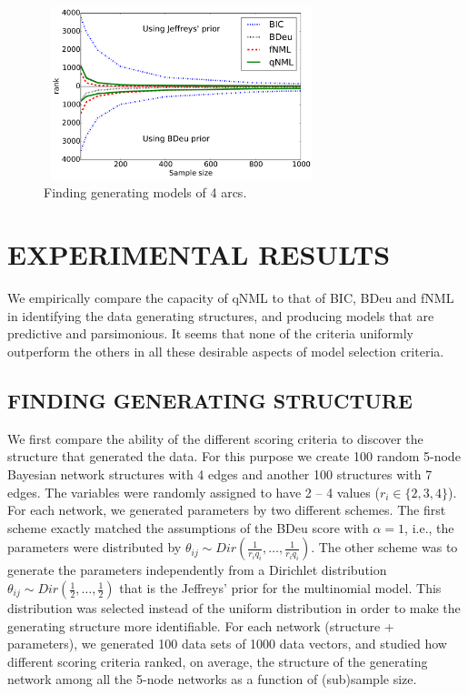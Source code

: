 \begin{figure}[h]
\centering
\includegraphics[width=8cm,height=5cm]{qNML_images/art4_mean.pdf}
\caption{Finding generating models of 4 arcs.}
\label{fig:4arcs}
\end{figure}

\section{EXPERIMENTAL RESULTS}

We empirically compare the capacity of qNML to that of BIC, BDeu and
fNML in identifying the data generating structures, and producing
models that are predictive and parsimonious.  It seems that none of
the criteria uniformly outperform the others in all these desirable
aspects of model selection criteria.

\subsection{FINDING GENERATING STRUCTURE}

We first compare the ability of the different scoring criteria to
discover the structure that generated the data. For this purpose we
create 100 random 5-node Bayesian network structures with 4
edges and another 100 structures with 7 edges.  The variables were
randomly assigned to have 2 -- 4 values ($r_i \in \{2, 3, 4\}$). For
each network, we generated parameters by two different schemes. The
first scheme exactly matched the assumptions of the BDeu score with
$\alpha = 1$, i.e., the parameters were distributed by $\theta_{ij}
\sim Dir(\frac{1}{r_iq_i},\ldots,\frac{1}{r_iq_i})$. The other scheme
was to generate the parameters independently from a Dirichlet
distribution $\theta_{ij} \sim Dir(\frac{1}{2},\ldots, \frac{1}{2})$
that is the Jeffreys' prior for the multinomial model. This distribution
was selected instead of the uniform distribution in order to make the
generating structure more identifiable.  For each network (structure +
parameters), we generated 100 data sets of 1000 data vectors, and
studied how different scoring criteria ranked, on average, the structure of the
generating network among all the 5-node networks as a function of
(sub)sample size.

